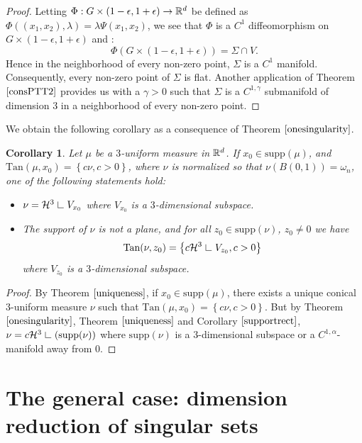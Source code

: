 \documentclass[11pt]{article}
\newtheorem{corollary}[theorem]{Corollary}
\theoremstyle{definition}
\theoremstyle{remark}
\numberwithin{equation}{section}
\newcommand{\res}{\hbox{{\vrule height .22cm}{\leaders\hrule\hskip .2cm}}}
\def\res{\hbox{ {\vrule height .22cm}{\leaders\hrule\hskip.2cm} } }
\begin{document}
\begin{proof}
 Letting $\Phi: G \times (1-\epsilon, 1+\epsilon) \rightarrow {\mathbb{R}}^d$ be defined as $\Phi((x_1,x_2),\lambda)=\lambda \Psi(x_1,x_2)$, we see that $\Phi$ is a $C^{1}$ diffeomorphism  on $G \times (1-\epsilon, 1+\epsilon)$ and :
 $$\Phi(G\times (1-\epsilon,1+\epsilon))=\Sigma \cap V. $$
Hence in the neighborhood of every non-zero point, $\Sigma$ is a $C^{1}$ manifold.
Consequently, every non-zero point of $\Sigma$ is flat.  Another application of Theorem $\ref{consPTT2}$  provides us with a $\gamma >0$ such that $\Sigma$ is a $C^{1,\gamma}$ submanifold of dimension 3 in a neighborhood of every non-zero point.

 \end{proof}
 
 We obtain the following corollary as a consequence of Theorem $\ref{onesingularity}$.
 
 \begin{corollary}\label{tangentsof3uniform}
 Let $\mu$ be a $3$-uniform  measure in $\mathbb{R}^{d}$. If $x_0 \in \mbox{supp}(\mu)$, and $\mbox{Tan}(\mu,x_0)=\left\lbrace c \nu , c>0 \right\rbrace$, where $\nu$ is normalized so that $\nu(B(0,1))=\omega_{n}$, one of the following statements hold:
 
 \begin{itemize}
 \item $\nu=\mathcal{H}^{3} \res V_{x_0}$ where $V_{x_0}$ is a $3$-dimensional subspace.
 \item The support of $\nu$ is not a plane, and for all $z_0 \in \mbox{supp}(\nu)$, $z_0 \neq 0$ we have $$\mbox{Tan}(\nu,z_0)=\left\lbrace c \mathcal{H}^{3} \res V_{z_0}, c>0 \right\rbrace$$ where $V_{z_0}$ is a $3$-dimensional subspace.
 \end{itemize}
 \end{corollary}
 \begin{proof}
 By Theorem $\ref{uniqueness}$, if $x_0 \in \mbox{supp}(\mu)$, there exists a unique conical $3$-uniform measure $\nu$ such that $\mbox{Tan}(\mu,x_0)=\left\lbrace c \nu , c>0 \right\rbrace $.
But by Theorem $\ref{onesingularity}$, Theorem $\ref{uniqueness}$ and Corollary $\ref{supportrect}$, $\nu=c \mathcal{H}^{3} \res (\mbox{supp}(\nu))$ where $\mbox{supp}(\nu)$ is a $3$-dimensional subspace or a $C^{1,\alpha}$-manifold away from $0$. \end{proof}

\section{The general case: dimension reduction of singular sets}
\end{document}
